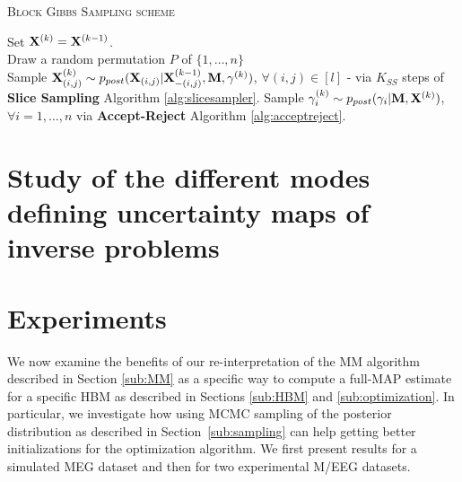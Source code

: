 {\fontsize{4}{4}\selectfont
\begin{algorithm}[t]
\caption{\textsc{Block Gibbs Sampling scheme}}

    {%
    Set $\mathbf{X}^{(k)} = \mathbf{X}^{(k-1)}$.\\
    		{
    		Draw a random permutation $P$ of $\{1,\ldots,n\}$\\
    			{
			Sample $\mathbf{X}_{(i,j)}^{(k)} \sim p_{post}(\mathbf{X}_{(i,j)}|\mathbf{X}_{-(i,j)}^{(k-1)},\mathbf{M},\gamma^{(k)})$, $\forall (i,j)\in [l]$ - via $K_{SS}$ steps of \textbf{Slice Sampling} Algorithm \ref{alg:slicesampler}.
			}
		}
	{Sample $\gamma^{(k)}_{i} \sim p_{post}(\gamma_{i}|\mathbf{M},\mathbf{X}^{(k)})$, $\forall i =1,\ldots,n$ via \textbf{Accept-Reject} Algorithm \ref{alg:acceptreject}.}

    }
\label{alg:sampling}
\end{algorithm}
}

\section{Study of the different modes defining uncertainty maps of inverse problems}

\section{Experiments}
We now examine the benefits of our re-interpretation of the MM algorithm described in Section \ref{sub:MM} as a specific way to compute a full-MAP estimate for a specific HBM as described in Sections \ref{sub:HBM} and \ref{sub:optimization}.
In particular, we investigate how using MCMC sampling of the posterior distribution as described in Section~\ref{sub:sampling} can help getting better initializations for the optimization algorithm.
We first present results for a simulated MEG dataset and then for two experimental M/EEG datasets.

